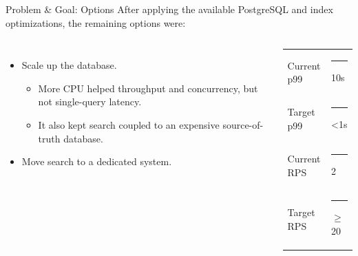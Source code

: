 \documentclass[aspectratio=169]{beamer}
\begin{document}
\begin{frame}{Problem \& Goal: Options}
  After applying the available PostgreSQL and index optimizations, the remaining options were:
  \begin{columns}[T,totalwidth=\textwidth]
      \begin{itemize}
        \item Scale up the database.
          \begin{itemize}
            \item More CPU helped throughput and concurrency, but not single-query latency.
            \item It also kept search coupled to an expensive source-of-truth database.
          \end{itemize}
        \item Move search to a dedicated system.
      \end{itemize}

      \begin{block}{}
        \small
        \begin{tabular}{@{}ll@{}}
          Current p99 & \textcolor{WarmAccent}{\rule{3.2cm}{0.18cm}} 10s \\
          Target p99 & \textcolor{SecondaryTeal}{\rule{0.35cm}{0.18cm}} <1s \\
          Current RPS & \textcolor{WarmAccent}{\rule{0.45cm}{0.18cm}} 2 \\
          Target RPS & \textcolor{SecondaryTeal}{\rule{3.8cm}{0.18cm}} $\geq$20
        \end{tabular}
      \end{block}
  \end{columns}
\end{frame}
\end{document}

